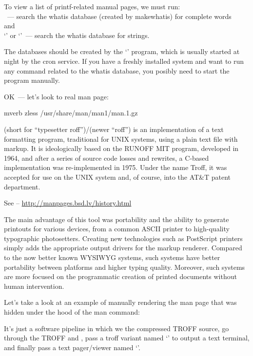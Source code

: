 To view a list of printf-related manual pages, we must run:\\
~--- search the whatis database (created by makewhatis)
for complete words\\
and\\
`' or `'~--- search the whatis database for strings.

The databases should be created by the `' program,
which is usually started at night by the cron service. If you have a freshly
installed system and want to run any command related to the whatis database,
you posibly need to start the  program manually.

OK~--- let's look to real man page:
\begin{code}{mverb}
zless /usr/share/man/man1/man.1.gz
\end{code}

(short for ``typesetter roff'')/(newer ``roff'') is
an implementation of a text formatting program, traditional for UNIX systems,
using a plain text file with markup. It is ideologically based on
the RUNOFF MIT program, developed in 1964, and after a series of source code
losses and rewrites, a C-based implementation was re-implemented in 1975.
Under the name Troff, it was accepted for use on the UNIX system and, of course,
into the AT\&T patent department.

See -- \href{http://manpages.bsd.lv/history.html}{http://manpages.bsd.lv/history.html}

The main advantage of this tool was portability and the ability to generate
printouts for various devices, from a common ASCII printer to high-quality
typographic photosetters. Creating new technologies such as PostScript printers
simply adds the appropriate output drivers for the markup renderer.
Compared to the now better known WYSIWYG systems, such systems have better
portability between platforms and higher typing quality. Moreover, such systems
are more focused on the programmatic creation of printed documents
without human intervention.

Let's take a look at an example of manually rendering the man page that
was hidden under the hood of the man command:

It's just a software pipeline in which we  the compressed TROFF
source, go through the TROFF \struct{preprocessor for tables} and
\struct{math equations}, pass a troff variant named `' to output
a text terminal, and finally pass a text pager/viewer named `\struct{less}'.

